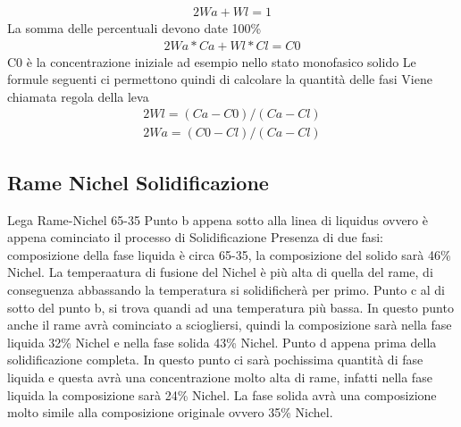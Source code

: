 \documentclass{article}%
\begin{document}
%
\newline%
%
\begin{alignat}{2}%
Wa + Wl = 1
%
\end{alignat}%
La somma delle percentuali devono date 100\%\newline%
%
\newline%
%
\begin{alignat}{2}%
Wa*Ca + Wl*Cl = C0
%
\end{alignat}%
C0 è la concentrazione iniziale ad esempio nello stato monofasico solido\newline%
%
\newline%
%
Le formule seguenti ci permettono quindi di calcolare la quantità delle fasi\newline%
%
Viene chiamata regola della leva\newline%
%
\newline%
%
\begin{alignat}{2}%
Wl = (Ca - C0) / (Ca - Cl)
%
\end{alignat}%
\begin{alignat}{2}%
Wa = (C0 - Cl) / (Ca - Cl)
%
\end{alignat}%
\newline%

%
\subsection{ Rame Nichel Solidificazione }%
\label{subsec:RameNichelSolidificazione}%
Lega Rame{-}Nichel 65{-}35\newline%
%
\newline%
%
Punto b appena sotto alla linea di liquidus ovvero è appena cominciato il processo di Solidificazione\newline%
%
Presenza di due fasi: composizione della fase liquida è circa 65{-}35, la composizione del solido sarà 46\% Nichel.\newline%
%
La temperaatura di fusione del Nichel è più alta di quella del rame, di conseguenza abbassando la temperatura si solidificherà per primo.\newline%
%
\newline%
%
Punto c al di sotto del punto b, si trova quandi ad una temperatura più bassa.\newline%
%
In questo punto anche il rame avrà cominciato a sciogliersi, quindi la composizione sarà nella fase liquida 32\% Nichel e nella fase solida 43\% Nichel.\newline%
%
\newline%
%
Punto d appena prima della solidificazione completa.\newline%
%
In questo punto ci sarà pochissima quantità di fase liquida e questa avrà una concentrazione molto alta di rame, infatti nella fase liquida la composizione sarà 24\% Nichel.\newline%
%
La fase solida avrà una composizione molto simile alla composizione originale ovvero 35\% Nichel.\newline%
%
\newline%
\end{document}
